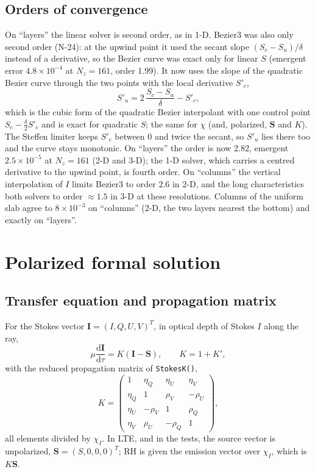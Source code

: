 \documentclass[11pt,a4paper]{article}
\newcommand{\code}[1]{\texttt{#1}}
\newcommand{\dd}{\mathrm{d}}
\newcommand{\Kp}{K'}
\newcommand{\vI}{\boldsymbol{I}}
\newcommand{\vS}{\boldsymbol{S}}
\begin{document}
\subsection{Orders of convergence}
On ``layers'' the linear solver is second order, as in 1-D. Bezier3 was
also only second order (N-24): at the upwind point it used the secant
slope $(S_c-S_u)/\delta$ instead of a derivative, so the Bezier curve was
exact only for linear $S$ (emergent error $4.8\times10^{-4}$ at
$N_z=161$, order 1.99). It now uses the slope of the quadratic Bezier
curve through the two points with the local derivative $S'_c$,
\begin{equation}
S'_u = 2\,\frac{S_c-S_u}{\delta} - S'_c ,
\end{equation}
which is the cubic form of the quadratic Bezier interpolant with one
control point $S_c - \tfrac\delta2 S'_c$ and is exact for quadratic $S$;
the same for $\chi$ (and, polarized, $\vS$ and $K$). The Steffen limiter
keeps $S'_c$ between 0 and twice the secant, so $S'_u$ lies there too and
the curve stays monotonic. On ``layers'' the order is now 2.82, emergent
$2.5\times10^{-5}$ at $N_z=161$ (2-D and 3-D); the 1-D solver, which
carries a centred derivative to the upwind point, is fourth order. On
``columns'' the vertical interpolation of $I$ limits Bezier3 to order
2.6 in 2-D, and the long characteristics both solvers to order
$\approx1.5$ in 3-D at these resolutions. Columns of the uniform slab agree to $8\times10^{-3}$
on ``columns'' (2-D, the two layers nearest the bottom) and exactly on
``layers''.

\section{Polarized formal solution}
\label{sec:stokes}

\subsection{Transfer equation and propagation matrix}
For the Stokes vector $\vI = (I,Q,U,V)^T$, in optical depth of Stokes $I$
along the ray,
\begin{equation}
\mu\frac{\dd\vI}{\dd\tau} = K(\vI-\vS),\qquad K = 1+\Kp,
\end{equation}
with the reduced propagation matrix of \code{StokesK()},
\begin{equation}
K = \begin{pmatrix}
1 & \eta_Q & \eta_U & \eta_V\\
\eta_Q & 1 & \rho_V & -\rho_U\\
\eta_U & -\rho_V & 1 & \rho_Q\\
\eta_V & \rho_U & -\rho_Q & 1
\end{pmatrix},
\end{equation}
all elements divided by $\chi_I$. In LTE, and in the tests, the source
vector is unpolarized, $\vS = (S,0,0,0)^T$; RH is given the emission
vector over $\chi_I$, which is $K\vS$.
\end{document}

